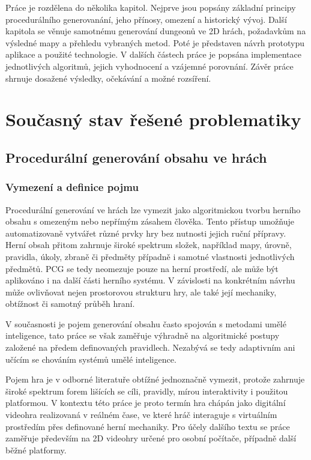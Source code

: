 \documentclass[
  program=itk,
  biblatex,
  figures=false,
  glossaries,
  index
]{kidiplom}
\begin{document}
Práce je rozdělena do několika kapitol. Nejprve jsou popsány základní principy procedurálního generovanání, jeho přínosy, omezení a historický vývoj. Další kapitola se věnuje samotnému generování dungeonů ve 2D hrách, požadavkům na výsledné mapy a přehledu vybraných metod. Poté je představen návrh prototypu aplikace a použité technologie. V dalších částech práce je popsána implementace jednotlivých algoritmů, jejich vyhodnocení a vzájemné porovnání. Závěr práce shrnuje dosažené výsledky, očekávání a možné rozsíření.


\section{Současný stav řešené problematiky}

\subsection{Procedurální generování obsahu ve hrách}

\subsubsection{Vymezení a definice pojmu}
Procedurální generování ve hrách lze vymezit jako algoritmickou tvorbu herního obsahu s omezeným nebo nepřímým zásahem člověka. Tento přístup umožňuje automatizovaně vytvářet různé prvky hry bez nutnosti jejich ruční přípravy. Herní obsah přitom zahrnuje široké spektrum složek, například mapy, úrovně, pravidla, úkoly, zbraně či předměty případně i samotné vlastnosti jednotlivých předmětů. PCG se tedy neomezuje pouze na herní prostředí, ale může být aplikováno i na další části herního systému. V závislosti na konkrétním návrhu může ovlivňovat nejen prostorovou strukturu hry, ale také její mechaniky, obtížnost či samotný průběh hraní.

V současnosti je pojem generování obsahu často spojován s metodami umělé inteligence, tato práce se však zaměřuje výhradně na algoritmické postupy založené na předem definovaných pravidlech. Nezabývá se tedy adaptivním ani učícím se chováním systémů umělé inteligence.

Pojem hra je v odborné literatuře obtížné jednoznačně vymezit, protože zahrnuje široké spektrum forem lišících se cíli, pravidly, mírou interaktivity i použitou platformou. V kontextu této práce je proto termín hra chápán jako digitální videohra realizovaná v reálném čase, ve které hráč interaguje s virtuálním prostředím přes definované herní mechaniky. Pro účely dalšího textu se práce zaměřuje především na 2D videohry určené pro osobní počítače, případně další běžné platformy.
\end{document}
